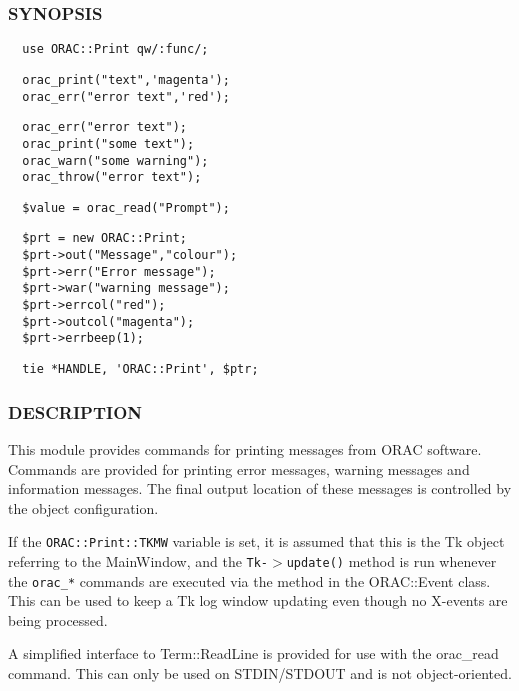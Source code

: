 \begin{description}
\subsubsection*{SYNOPSIS\label{ORAC::Print_SYNOPSIS}}
\begin{verbatim}
  use ORAC::Print qw/:func/;
\end{verbatim}
\begin{verbatim}
  orac_print("text",'magenta');
  orac_err("error text",'red');
\end{verbatim}
\begin{verbatim}
  orac_err("error text");
  orac_print("some text");
  orac_warn("some warning");
  orac_throw("error text");
\end{verbatim}
\begin{verbatim}
  $value = orac_read("Prompt");
\end{verbatim}
\begin{verbatim}
  $prt = new ORAC::Print;
  $prt->out("Message","colour");
  $prt->err("Error message"); 
  $prt->war("warning message");
  $prt->errcol("red");
  $prt->outcol("magenta");
  $prt->errbeep(1);
\end{verbatim}
\begin{verbatim}
  tie *HANDLE, 'ORAC::Print', $ptr;
\end{verbatim}
\subsubsection*{DESCRIPTION\label{ORAC::Print_DESCRIPTION}}


This module provides commands for printing messages from ORAC
software. Commands are provided for printing error messages, warning
messages and information messages. The final output location of these
messages is controlled by the object configuration.



If the \texttt{ORAC::Print::TKMW} variable is set, it is assumed that this
is the Tk object referring to the MainWindow, and the
\texttt{Tk-$>$update()} method is run whenever the \texttt{orac\_*} commands are
executed via the method in the ORAC::Event class.  This can be used to 
keep a Tk log window updating even though no X-events are being processed.



A simplified interface to Term::ReadLine is provided for use with
the orac\_read command. This can only be used on STDIN/STDOUT and
is not object-oriented.


\end{description}
